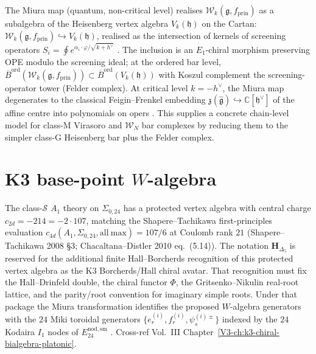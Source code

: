 \begin{remark}\label{rem:miura-chiral-compatibility}
The Miura map (quantum, non-critical level) realises $\mathcal{W}_k(\mathfrak{g}, f_{\mathrm{prin}})$ as a subalgebra of the Heisenberg vertex algebra $V_k(\mathfrak{h})$ on the Cartan:
$\mathcal{W}_k(\mathfrak{g}, f_{\mathrm{prin}}) \hookrightarrow V_k(\mathfrak{h})$,
realised as the intersection of kernels of screening operators $S_i = \oint e^{\alpha_i \cdot \varphi/\sqrt{k+h^\vee}}$ \cite{FF90,FL88}. The inclusion is an $E_1$-chiral morphism preserving OPE modulo the screening ideal; at the ordered bar level, $\overline{B}^{\mathrm{ord}}(\mathcal{W}_k(\mathfrak{g}, f_{\mathrm{prin}})) \subset \overline{B}^{\mathrm{ord}}(V_k(\mathfrak{h}))$ with Koszul complement the screening-operator tower (Felder complex). At critical level $k = -h^\vee$, the Miura map degenerates to the classical Feigin--Frenkel embedding $\mathfrak{z}(\widehat{\mathfrak{g}}) \hookrightarrow \mathbb{C}[\mathfrak{h}^\vee]$ of the affine centre into polynomials on opers \cite{Ara07}. This supplies a concrete chain-level model for class-M Virasoro and $\mathcal{W}_N$ bar complexes by reducing them to the simpler class-G Heisenberg bar plus the Felder complex.
\end{remark}

\section{K3 base-point $W$-algebra}
\label{sec:wa-supplement}

\begin{remark}
\label{rem:wa-1}
The class-$\mathcal S$ $A_1$ theory on $\Sigma_{0,24}$ has a protected
vertex algebra with central charge
$c_{2d} = -214 = -2\cdot 107$, matching the Shapere--Tachikawa
first-principles evaluation
$c_{4d}(A_1, \Sigma_{0,24}, \mathrm{all\ max}) = 107/6$ at Coulomb
rank $21$ (Shapere--Tachikawa 2008 \S 3; Chacaltana--Distler 2010
eq.~(5.14)). The notation $\mathbf H_{\Delta_5}$ is reserved for the
additional finite Hall--Borcherds recognition of this protected vertex
algebra as the K3 Borcherds/Hall chiral avatar. That recognition must
fix the Hall--Drinfeld double, the chiral functor $\Phi$, the
Gritsenko--Nikulin real-root lattice, and the parity/root convention for
imaginary simple roots. Under that package the Miura transformation
identifies the proposed $W$-algebra generators with the
$24$ Miki toroidal generators $\{e^{(i)}_r, f^{(i)}_r, \psi^{(i)\pm}_s\}$
indexed by the $24$ Kodaira $I_1$ nodes of $E^{\mathrm{nod,sm}}_{24}$
\cite{Gaiotto2009,Miki2007}. Cross-ref Vol.~III
Chapter~\ref{V3-ch:k3-chiral-bialgebra-platonic}.
\end{remark}

